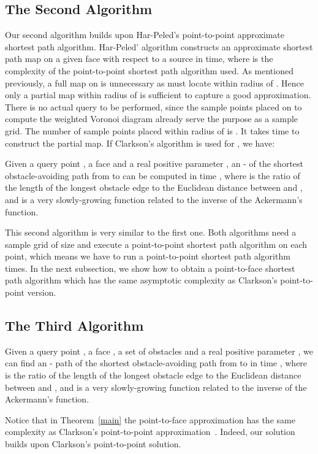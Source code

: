 \documentclass{llncs}
\begin{document}
\subsection{The Second Algorithm}
Our second algorithm builds upon Har-Peled's point-to-point approximate shortest path algorithm. Har-Peled' algorithm constructs an approximate shortest path map on a given face  with respect to a source  in  time, where  is the complexity of the point-to-point shortest path algorithm used. As mentioned previously, a full map on  is unnecessary as  must locate within  radius of . Hence only a partial map within  radius of  is sufficient to capture a good approximation. There is no actual query to be performed, since the sample points placed on  to compute the weighted Voronoi diagram already serve the purpose as a sample grid. The number of sample points placed within  radius of  is  \cite{Sar99}. It takes  time to construct the partial map. If Clarkson's algorithm is used for , we have:

\begin{theorem}
Given a query point , a face  and a real positive parameter , an - of
the shortest obstacle-avoiding path from  to  can be computed in  time
, where  is the ratio of the length of the longest obstacle edge to the
Euclidean distance between  and , and  is a very slowly-growing function related to
the inverse of the Ackermann's function.
\end{theorem}

This second algorithm is very similar to the first one. Both algorithms need a sample grid of size  and execute a point-to-point shortest path algorithm on each point, which means we have to run a point-to-point shortest path algorithm  times.
In the next subsection, we show how to obtain a point-to-face shortest path algorithm which has the same asymptotic complexity as Clarkson's point-to-point version.

\subsection{The Third Algorithm}
\begin{theorem}
\label{main}
Given a query point , a face , a set of obstacles  and a real positive parameter , we can find an - path of
the shortest obstacle-avoiding path from  to  in time
, where  is the ratio of the length of the longest obstacle edge to the
Euclidean distance between  and , and  is a very slowly-growing function related to
the inverse of the Ackermann's function.
\end{theorem}
Notice that in Theorem~\ref{main} the point-to-face approximation has the same complexity as Clarkson's
point-to-point approximation~\cite{Clar87}. Indeed, our solution builds upon Clarkson's point-to-point solution.
\end{document}
